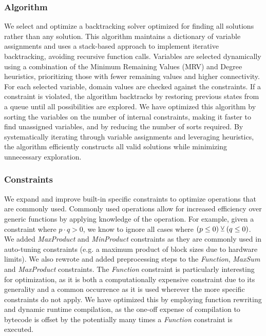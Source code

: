 \subsubsection{Algorithm} \label{subsubsec:searchspace_construction_improvements_algorithm}
We select and optimize a backtracking solver optimized for finding all solutions rather than any solution. This algorithm maintains a dictionary of variable assignments and uses a stack-based approach to implement iterative backtracking, avoiding recursive function calls. Variables are selected dynamically using a combination of the Minimum Remaining Values (MRV) and Degree heuristics, prioritizing those with fewer remaining values and higher connectivity. For each selected variable, domain values are checked against the constraints. If a constraint is violated, the algorithm backtracks by restoring previous states from a queue until all possibilities are explored. 
We have optimized this algorithm by sorting the variables on the number of internal constraints, making it faster to find unassigned variables, and by reducing the number of sorts required. 
By systematically iterating through variable assignments and leveraging heuristics, the algorithm efficiently constructs all valid solutions while minimizing unnecessary exploration. 

\subsubsection{Constraints} \label{subsubsec:searchspace_construction_improvements_constraints}
We expand and improve built-in specific constraints to optimize operations that are commonly used. 
Commonly used operations allow for increased efficiency over generic functions by applying knowledge of the operation. For example, given a constraint where $p \cdot q > 0$, we know to ignore all cases where $(p \leq 0) \veebar (q \leq 0)$. 
We added \textit{MaxProduct} and \textit{MinProduct} constraints as they are commonly used in auto-tuning constraints (e.g. a maximum product of block sizes due to hardware limits). We also rewrote and added preprocessing steps to the \textit{Function}, \textit{MaxSum} and \textit{MaxProduct} constraints.  
The \textit{Function} constraint is particularly interesting for optimization, as it is both a computationally expensive constraint due to its generality and a common occurrence as it is used wherever the more specific constraints do not apply. We have optimized this by employing function rewriting and dynamic runtime compilation, as the one-off expense of compilation to bytecode is offset by the potentially many times a \textit{Function} constraint is executed. %

